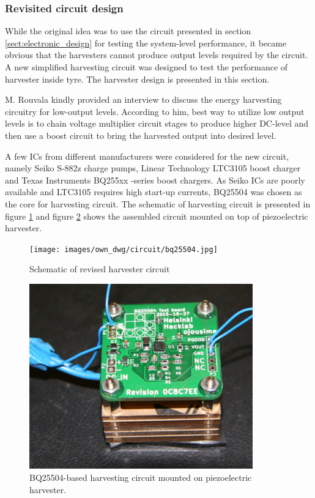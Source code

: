 \subsubsection{Revisited circuit design}
While the original idea was to use the circuit presented in section \ref{sect:electronic_design} for testing the system-level performance, it became obvious that the harvesters cannot produce output levels required by the circuit. A new simplified harvesting circuit was designed to test the performance of harvester inside tyre. The harvester design is presented in this section.

M. Rouvala kindly provided an interview \cite{Rouvala2015} to discuss the energy harvesting circuitry for low-output levels. According to him, best way to utilize low output levels is to chain voltage multiplier circuit stages to produce higher DC-level and then use a boost circuit to bring the harvested output into desired level. 

A few ICs from different manufacturers were considered for the new circuit, namely Seiko S-882z \cite{SeikoInstruments2010} charge pumps, Linear Technology LTC3105 \cite{ltc3015} boost charger and Texas Instruments BQ255xx -series boost chargers. As Seiko ICs are poorly available and LTC3105 requires high start-up currents, BQ25504 \cite{bq25504} was chosen as the core for harvesting circuit. The schematic of harvesting circuit is presented in figure \ref{fig:bq25504} and figure \ref{fig:bq25504_mounted} shows the assembled circuit mounted on top of piezoelectric harvester.

\begin{figure}[htb]
\begin{center}
\texttt{[image: images/own\_dwg/circuit/bq25504.jpg]}
\end{center}
\caption{\label{fig:bq25504} Schematic of revised harvester circuit}
\end{figure}

\begin{figure}[htb]
\begin{center}
\includegraphics[height=8cm]{images/own_pic/tyre_fixture/piezo_bq_desk.jpg}
\end{center}
\caption{\label{fig:bq25504_mounted} BQ25504-based harvesting circuit mounted on piezoelectric harvester.}
\end{figure}

